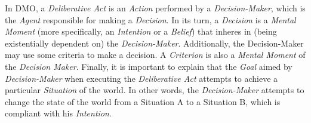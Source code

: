 In DMO, a \textit{Deliberative Act} is an \textit{Action} performed by a \textit{Decision-Maker}, which is the \textit{Agent} responsible for making a \textit{Decision}. In its turn, a \textit{Decision} is a \textit{Mental Moment} (more specifically, an \textit{Intention} or a \textit{Belief}) that inheres in (being existentially dependent on) the \textit{Decision-Maker}. Additionally, the Decision-Maker may use some criteria to make a decision. A \textit{Criterion} is also a \textit{Mental Moment} of the \textit{Decision Maker}. Finally, it is important to explain that the \textit{Goal} aimed by \textit{Decision-Maker} when executing the \textit{Deliberative Act} attempts to achieve a particular \textit{Situation} of the world. In other words, the \textit{Decision-Maker} attempts to change the state of the world from a Situation A to a Situation B, which is compliant with his \textit{Intention}.

